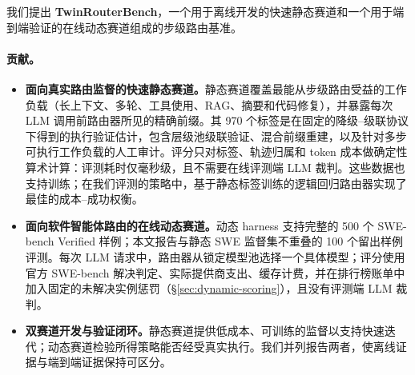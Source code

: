 我们提出 \textbf{TwinRouterBench}，一个用于离线开发的快速静态赛道和一个用于端到端验证的在线动态赛道组成的步级路由基准。

\paragraph{贡献。}
\begin{itemize}[leftmargin=*, itemsep=1pt, topsep=2pt]
\item \textbf{面向真实路由监督的快速静态赛道。}静态赛道覆盖最能从步级路由受益的工作负载（长上下文、多轮、工具使用、RAG、摘要和代码修复），并暴露每次 LLM 调用前路由器所见的精确前缀。其 970 个标签是在固定的降级--级联协议下得到的执行验证估计，包含层级池级联验证、混合前缀重建，以及针对多步可执行工作负载的人工审计。评分只对标签、轨迹归属和 token 成本做确定性算术计算：评测耗时仅毫秒级，且不需要在线评测端 LLM 裁判。这些数据也支持训练；在我们评测的策略中，基于静态标签训练的逻辑回归路由器实现了最佳的成本--成功权衡。
\item \textbf{面向软件智能体路由的在线动态赛道。}动态 harness 支持完整的 500 个 SWE-bench Verified 样例；本文报告与静态 SWE 监督集不重叠的 100 个留出样例评测。每次 LLM 请求中，路由器从锁定模型池选择一个具体模型；评分使用官方 SWE-bench 解决判定、实际提供商支出、缓存计费，并在排行榜账单中加入固定的未解决实例惩罚（\S\ref{sec:dynamic-scoring}），且没有评测端 LLM 裁判。
\item \textbf{双赛道开发与验证闭环。}静态赛道提供低成本、可训练的监督以支持快速迭代；动态赛道检验所得策略能否经受真实执行。我们并列报告两者，使离线证据与端到端证据保持可区分。
\end{itemize}
